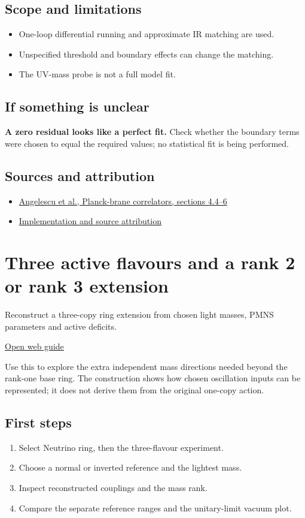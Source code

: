\documentclass[11pt,a4paper]{article}
\begin{document}
\subsection*{Scope and limitations}
\begin{itemize}
\item One-loop differential running and approximate IR matching are used.
\item Unspecified threshold and boundary effects can change the matching.
\item The UV-mass probe is not a full model fit.
\end{itemize}
\subsection*{If something is unclear}
\textbf{A zero residual looks like a perfect fit.} Check whether the boundary terms were chosen to equal the required values; no statistical fit is being performed.

\subsection*{Sources and attribution}
\begin{itemize}
\item \href{https://arxiv.org/abs/2512.22094}{Angelescu et al., Planck-brane correlators, sections 4.4--6}
\item \href{https://github.com/karlesmarin/ghu-lab/blob/main/src/modules/rs_unification.mjs}{Implementation and source attribution}
\end{itemize}
\section{Three active flavours and a rank 2 or rank 3 extension}
Reconstruct a three-copy ring extension from chosen light masses, PMNS parameters and active deficits.

\href{https://karlesmarin.github.io/ghu-explorer/guide/flavour/index.html}{Open web guide}

Use this to explore the extra independent mass directions needed beyond the rank-one base ring. The construction shows how chosen oscillation inputs can be represented; it does not derive them from the original one-copy action.
\subsection*{First steps}
\begin{enumerate}
\item Select Neutrino ring, then the three-flavour experiment.
\item Choose a normal or inverted reference and the lightest mass.
\item Inspect reconstructed couplings and the mass rank.
\item Compare the separate reference ranges and the unitary-limit vacuum plot.
\end{enumerate}
\end{document}
